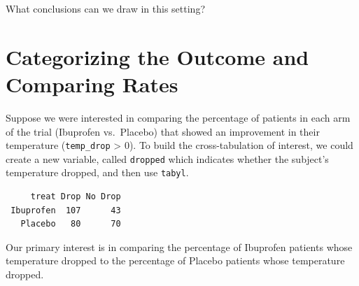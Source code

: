 \documentclass[
]{book}
\newenvironment{Shaded}{\begin{snugshade}}{\end{snugshade}}
\newcommand{\DataTypeTok}[1]{\textcolor[rgb]{0.13,0.29,0.53}{#1}}
\newcommand{\DecValTok}[1]{\textcolor[rgb]{0.00,0.00,0.81}{#1}}
\newcommand{\KeywordTok}[1]{\textcolor[rgb]{0.13,0.29,0.53}{\textbf{#1}}}
\newcommand{\NormalTok}[1]{#1}
\newcommand{\OperatorTok}[1]{\textcolor[rgb]{0.81,0.36,0.00}{\textbf{#1}}}
\newcommand{\StringTok}[1]{\textcolor[rgb]{0.31,0.60,0.02}{#1}}
\begin{document}
What conclusions can we draw in this setting?

\hypertarget{categorizing-the-outcome-and-comparing-rates}{%
\section{Categorizing the Outcome and Comparing Rates}\label{categorizing-the-outcome-and-comparing-rates}}

Suppose we were interested in comparing the percentage of patients in each arm of the trial (Ibuprofen vs.~Placebo) that showed an improvement in their temperature (\texttt{temp\_drop} \textgreater{} 0). To build the cross-tabulation of interest, we could create a new variable, called \texttt{dropped} which indicates whether the subject's temperature dropped, and then use \texttt{tabyl}.

\begin{Shaded}
\end{Shaded}

\begin{verbatim}
     treat Drop No Drop
 Ibuprofen  107      43
   Placebo   80      70
\end{verbatim}

Our primary interest is in comparing the percentage of Ibuprofen patients whose temperature dropped to the percentage of Placebo patients whose temperature dropped.

\begin{Shaded}
\end{Shaded}
\end{document}
